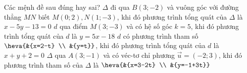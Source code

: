 \begin{ex}%
	Các mệnh đề sau đúng hay sai?
	\choiceTF
	{\True $\Delta$ đi qua $B(3;-2)$ và vuông góc với đường thẳng $MN$ biết $M(0;2),N(1;-3)$, khi đó phương trình tổng quát của $\Delta$ là $x-5y-13=0$}
	{\True $d$ qua điểm $M(3;-3)$ và có hệ số góc $k=5$, khi đó phương trình tổng quát của $d$ là $y=5x-18$}
	{$d$ có phương trình tham số $\heva{&{x=2-t} \\	&{y=t}}$, khi đó phương trình tổng quát của $d$ là $x+y+2=0$}
	{\True $\Delta$ qua $A(3;-1)$ và có véc-tơ chỉ phương $\overrightarrow{u}=(-2;3)$, khi đó phương trình tham số của $\Delta$ là $\heva{&{x=3-2t} \\	&{y=-1+3t}}$}
\end{ex}
